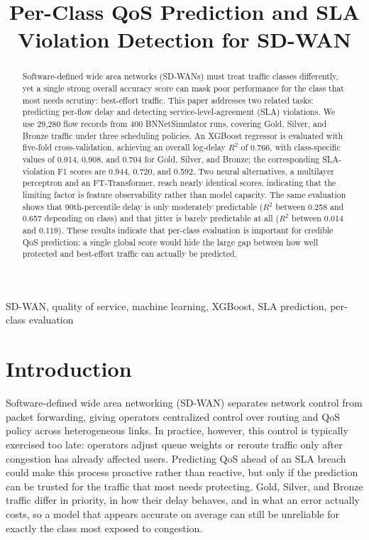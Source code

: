 \documentclass[conference]{IEEEtran}
\title{Per-Class QoS Prediction and SLA Violation Detection for SD-WAN}
\author{\IEEEauthorblockN{Radhika (Rishiv) Shitlani}
\IEEEauthorblockA{School of Computer Science\\
University of Galway, Galway, Ireland}}
\begin{document}
\maketitle

\begin{abstract}
Software-defined wide area networks (SD-WANs) must treat traffic classes differently, yet a single strong overall accuracy score can mask poor performance for the class that most needs scrutiny: best-effort traffic. This paper addresses two related tasks: predicting per-flow delay and detecting service-level-agreement (SLA) violations. We use 29,280 flow records from 400 BNNetSimulator runs, covering Gold, Silver, and Bronze traffic under three scheduling policies. An XGBoost regressor is evaluated with five-fold cross-validation, achieving an overall log-delay $R^2$ of 0.766, with class-specific values of 0.914, 0.908, and 0.704 for Gold, Silver, and Bronze; the corresponding SLA-violation F1 scores are 0.944, 0.720, and 0.592. Two neural alternatives, a multilayer perceptron and an FT-Transformer, reach nearly identical scores, indicating that the limiting factor is feature observability rather than model capacity. The same evaluation shows that 90th-percentile delay is only moderately predictable ($R^2$ between 0.258 and 0.657 depending on class) and that jitter is barely predictable at all ($R^2$ between 0.014 and 0.119). These results indicate that per-class evaluation is important for credible QoS prediction: a single global score would hide the large gap between how well protected and best-effort traffic can actually be predicted.
\end{abstract}

\begin{IEEEkeywords}
SD-WAN, quality of service, machine learning, XGBoost, SLA prediction, per-class evaluation
\end{IEEEkeywords}

\section{Introduction}

Software-defined wide area networking (SD-WAN) separates network control from packet forwarding, giving operators centralized control over routing and QoS policy across heterogeneous links. In practice, however, this control is typically exercised too late: operators adjust queue weights or reroute traffic only after congestion has already affected users. Predicting QoS ahead of an SLA breach could make this process proactive rather than reactive, but only if the prediction can be trusted for the traffic that most needs protecting. Gold, Silver, and Bronze traffic differ in priority, in how their delay behaves, and in what an error actually costs, so a model that appears accurate on average can still be unreliable for exactly the class most exposed to congestion.
\end{document}
